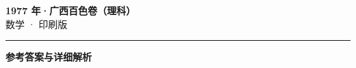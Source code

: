 \documentclass[zihao=5, a4paper]{ctexart}
\begin{document}
\begin{center}
  {\Large\bfseries 1977 年·广西百色卷（理科）}\\[4pt]
  {\large 数学 · 印刷版}
\end{center}
\medskip
{}

\par\bigskip\hrule\bigskip
{}
\begin{center}{\large\bfseries 参考答案与详细解析}\end{center}
\smallskip

\end{document}
